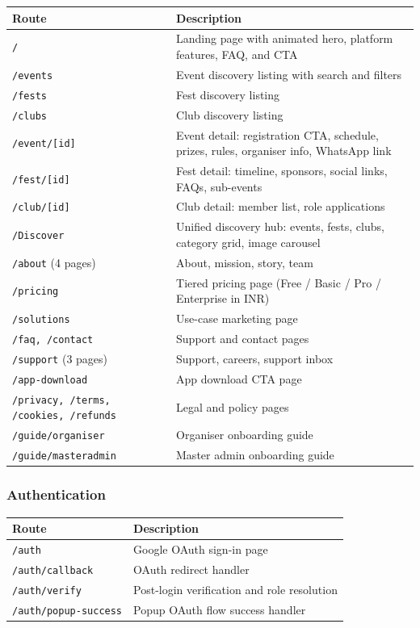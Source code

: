 \documentclass[12pt,a4paper]{article}
\begin{document}
\begin{tabularx}{\textwidth}{L{4.5cm} X}
\toprule
{}
\textbf{Route} & \textbf{Description} \\
\midrule
\texttt{/} & Landing page with animated hero, platform features, FAQ, and CTA \\
\texttt{/events} & Event discovery listing with search and filters \\
\texttt{/fests} & Fest discovery listing \\
\texttt{/clubs} & Club discovery listing \\
\texttt{/event/[id]} & Event detail: registration CTA, schedule, prizes, rules, organiser info, WhatsApp link \\
\texttt{/fest/[id]} & Fest detail: timeline, sponsors, social links, FAQs, sub-events \\
\texttt{/club/[id]} & Club detail: member list, role applications \\
\texttt{/Discover} & Unified discovery hub: events, fests, clubs, category grid, image carousel \\
\texttt{/about} (4 pages) & About, mission, story, team \\
\texttt{/pricing} & Tiered pricing page (Free / Basic / Pro / Enterprise in INR) \\
\texttt{/solutions} & Use-case marketing page \\
\texttt{/faq, /contact} & Support and contact pages \\
\texttt{/support} (3 pages) & Support, careers, support inbox \\
\texttt{/app-download} & App download CTA page \\
\texttt{/privacy, /terms, /cookies, /refunds} & Legal and policy pages \\
\texttt{/guide/organiser} & Organiser onboarding guide \\
\texttt{/guide/masteradmin} & Master admin onboarding guide \\
\bottomrule
\end{tabularx}

\subsubsection{Authentication}

\begin{tabularx}{\textwidth}{L{4.5cm} X}
\toprule
{}
\textbf{Route} & \textbf{Description} \\
\midrule
\texttt{/auth} & Google OAuth sign-in page \\
\texttt{/auth/callback} & OAuth redirect handler \\
\texttt{/auth/verify} & Post-login verification and role resolution \\
\texttt{/auth/popup-success} & Popup OAuth flow success handler \\
\bottomrule
\end{tabularx}
\end{document}
